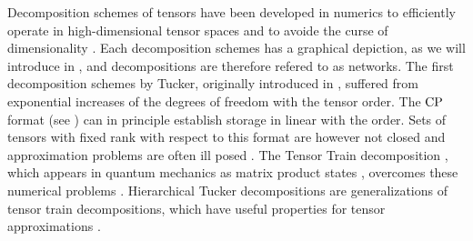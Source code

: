 
Decomposition schemes of tensors have been developed in numerics to efficiently operate in high-dimensional tensor spaces \cite{hackbusch_tensor_2012} and to avoide the curse of dimensionality \cite{bellman_adaptive_1961}.
Each decomposition schemes has a graphical depiction, as we will introduce in , and decompositions are therefore refered to as networks.
The first decomposition schemes by Tucker, originally introduced in \cite{hitchcock_expression_1927}, suffered from exponential increases of the degrees of freedom with the tensor order.
The $\mathrm{CP}$ format (see ) can in principle establish storage in linear with the order.
Sets of tensors with fixed rank with respect to this format are however not closed \cite{beylkin_algorithms_2005} and approximation problems are often ill posed \cite{de_silva_tensor_2008}.
The Tensor Train decomposition \cite{oseledets_breaking_2009}, which appears in quantum mechanics as matrix product states \cite{perez-garcia_matrix_2007}, overcomes these numerical problems \cite{holtz_manifolds_2012}.
Hierarchical Tucker decompositions \cite{hackbusch_new_2009} are generalizations of tensor train decompositions, which have useful properties for tensor approximations \cite{grasedyck_hierarchical_2010,falco_minimal_2012}.

